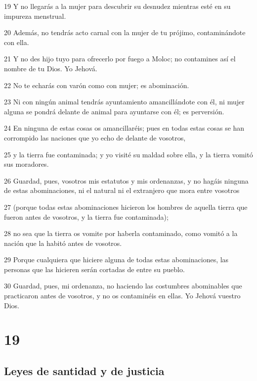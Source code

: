 \par 19 Y no llegarás a la mujer para descubrir su desnudez mientras esté en su impureza menstrual.
\par 20 Además, no tendrás acto carnal con la mujer de tu prójimo, contaminándote con ella.
\par 21 Y no des hijo tuyo para ofrecerlo por fuego a Moloc; no contamines así el nombre de tu Dios. Yo Jehová.
\par 22 No te echarás con varón como con mujer; es abominación.
\par 23 Ni con ningún animal tendrás ayuntamiento amancillándote con él, ni mujer alguna se pondrá delante de animal para ayuntarse con él; es perversión.
\par 24 En ninguna de estas cosas os amancillaréis; pues en todas estas cosas se han corrompido las naciones que yo echo de delante de vosotros,
\par 25 y la tierra fue contaminada; y yo visité su maldad sobre ella, y la tierra vomitó sus moradores.
\par 26 Guardad, pues, vosotros mis estatutos y mis ordenanzas, y no hagáis ninguna de estas abominaciones, ni el natural ni el extranjero que mora entre vosotros
\par 27 (porque todas estas abominaciones hicieron los hombres de aquella tierra que fueron antes de vosotros, y la tierra fue contaminada);
\par 28 no sea que la tierra os vomite por haberla contaminado, como vomitó a la nación que la habitó antes de vosotros.
\par 29 Porque cualquiera que hiciere alguna de todas estas abominaciones, las personas que las hicieren serán cortadas de entre su pueblo.
\par 30 Guardad, pues, mi ordenanza, no haciendo las costumbres abominables que practicaron antes de vosotros, y no os contaminéis en ellas. Yo Jehová vuestro Dios.

\chapter{19}

\section*{Leyes de santidad y de justicia}

